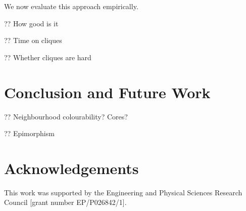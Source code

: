 \documentclass{article}
\begin{document}
We now evaluate this approach empirically.

?? How good is it

?? Time on cliques

?? Whether cliques are hard

\section{Conclusion and Future Work}

?? Neighbourhood colourability? Cores?

?? Epimorphism

\section*{Acknowledgements}

This work was supported by the Engineering and Physical Sciences Research Council [grant number
EP/P026842/1].



\end{document}
